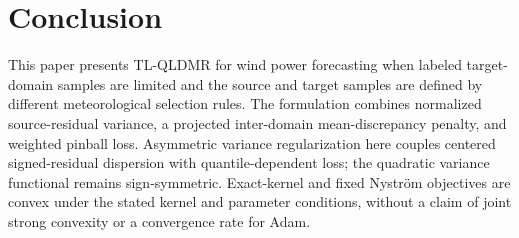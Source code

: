 \documentclass[a4paper]{cas-sc}
\begin{document}
\section{Conclusion}\label{conclusion}
{\color{blue}This paper presents TL-QLDMR for wind power forecasting when labeled target-domain samples are limited and the source and target samples are defined by different meteorological selection rules. The formulation combines normalized source-residual variance, a projected inter-domain mean-discrepancy penalty, and weighted pinball loss. Asymmetric variance regularization here couples centered signed-residual dispersion with quantile-dependent loss; the quadratic variance functional remains sign-symmetric. Exact-kernel and fixed Nystr\"{o}m objectives are convex under the stated kernel and parameter conditions, without a claim of joint strong convexity or a convergence rate for Adam.}
\end{document}
